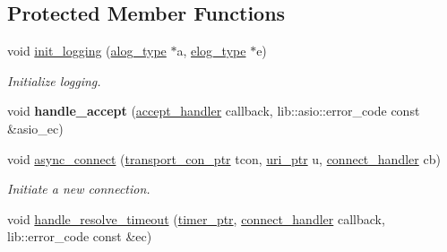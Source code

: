 \subsection*{Protected Member Functions}
\begin{DoxyCompactItemize}
\item 
void \mbox{\hyperlink{classwebsocketpp_1_1transport_1_1asio_1_1endpoint_a26ad1ad26277ed99a691559e69d47932}{init\+\_\+logging}} (\mbox{\hyperlink{classwebsocketpp_1_1transport_1_1asio_1_1endpoint_acba708e66a47d4aae9a053d364585b81}{alog\+\_\+type}} $\ast$a, \mbox{\hyperlink{classwebsocketpp_1_1transport_1_1asio_1_1endpoint_a2aa93730c801602b55b585121a2898c0}{elog\+\_\+type}} $\ast$e)
\begin{DoxyCompactList}\small\item\em Initialize logging. \end{DoxyCompactList}\item 
\mbox{\label{classwebsocketpp_1_1transport_1_1asio_1_1endpoint_a8154dd7191c0d8df984a202bc2e54cf7}} 
void {\bfseries handle\+\_\+accept} (\mbox{\hyperlink{namespacewebsocketpp_1_1transport_a9326ea831379368ee47841b2e46cb009}{accept\+\_\+handler}} callback, lib\+::asio\+::error\+\_\+code const \&asio\+\_\+ec)
\item 
\mbox{\label{classwebsocketpp_1_1transport_1_1asio_1_1endpoint_a1ca12e4d72c691e6cc1ce1f5316e3243}} 
void \mbox{\hyperlink{classwebsocketpp_1_1transport_1_1asio_1_1endpoint_a1ca12e4d72c691e6cc1ce1f5316e3243}{async\+\_\+connect}} (\mbox{\hyperlink{classwebsocketpp_1_1transport_1_1asio_1_1endpoint_ac5fc306f32d15f92dd1b22366eaba62d}{transport\+\_\+con\+\_\+ptr}} tcon, \mbox{\hyperlink{namespacewebsocketpp_aae370ea5ac83a8ece7712cb39fc23f5b}{uri\+\_\+ptr}} u, \mbox{\hyperlink{namespacewebsocketpp_1_1transport_ac392fca34e946b48414278c0c3addfa5}{connect\+\_\+handler}} cb)
\begin{DoxyCompactList}\small\item\em Initiate a new connection. \end{DoxyCompactList}\item 
void \mbox{\hyperlink{classwebsocketpp_1_1transport_1_1asio_1_1endpoint_ac240587f91cf837babbbb7c48b3cff40}{handle\+\_\+resolve\+\_\+timeout}} (\mbox{\hyperlink{classwebsocketpp_1_1transport_1_1asio_1_1endpoint_a1802f5762009dbed117ff793fa87468f}{timer\+\_\+ptr}}, \mbox{\hyperlink{namespacewebsocketpp_1_1transport_ac392fca34e946b48414278c0c3addfa5}{connect\+\_\+handler}} callback, lib\+::error\+\_\+code const \&ec)

\end{DoxyCompactItemize}
